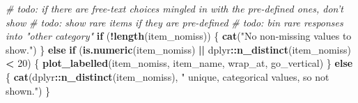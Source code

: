 \documentclass[]{book}
\newenvironment{Shaded}{\begin{snugshade}}{\end{snugshade}}
\newcommand{\KeywordTok}[1]{\textcolor[rgb]{0.13,0.29,0.53}{\textbf{#1}}}
\newcommand{\DataTypeTok}[1]{\textcolor[rgb]{0.13,0.29,0.53}{#1}}
\newcommand{\DecValTok}[1]{\textcolor[rgb]{0.00,0.00,0.81}{#1}}
\newcommand{\FloatTok}[1]{\textcolor[rgb]{0.00,0.00,0.81}{#1}}
\newcommand{\StringTok}[1]{\textcolor[rgb]{0.31,0.60,0.02}{#1}}
\newcommand{\CommentTok}[1]{\textcolor[rgb]{0.56,0.35,0.01}{\textit{#1}}}
\newcommand{\ControlFlowTok}[1]{\textcolor[rgb]{0.13,0.29,0.53}{\textbf{#1}}}
\newcommand{\OperatorTok}[1]{\textcolor[rgb]{0.81,0.36,0.00}{\textbf{#1}}}
\newcommand{\NormalTok}[1]{#1}
\begin{document}
\begin{Shaded}
\end{Shaded}

\begin{Shaded}
\begin{Highlighting}[]
\CommentTok{# todo: if there are free-text choices mingled in with the pre-defined ones, don't show}
\CommentTok{# todo: show rare items if they are pre-defined}
\CommentTok{# todo: bin rare responses into "other category"}
\ControlFlowTok{if}\NormalTok{ (}\OperatorTok{!}\KeywordTok{length}\NormalTok{(item_nomiss)) \{}
  \KeywordTok{cat}\NormalTok{(}\StringTok{"No non-missing values to show."}\NormalTok{)}
\NormalTok{\} }\ControlFlowTok{else} \ControlFlowTok{if}\NormalTok{ (}\KeywordTok{is.numeric}\NormalTok{(item_nomiss) }\OperatorTok{||}\StringTok{ }\NormalTok{dplyr}\OperatorTok{::}\KeywordTok{n_distinct}\NormalTok{(item_nomiss) }\OperatorTok{<}\StringTok{ }\DecValTok{20}\NormalTok{) \{}
  \KeywordTok{plot_labelled}\NormalTok{(item_nomiss, item_name, wrap_at, go_vertical)}
\NormalTok{\} }\ControlFlowTok{else}\NormalTok{ \{}
    \KeywordTok{cat}\NormalTok{(dplyr}\OperatorTok{::}\KeywordTok{n_distinct}\NormalTok{(item_nomiss), }\StringTok{" unique, categorical values, so not shown."}\NormalTok{)}
\NormalTok{\}}
\end{Highlighting}
\end{Shaded}
\end{document}
